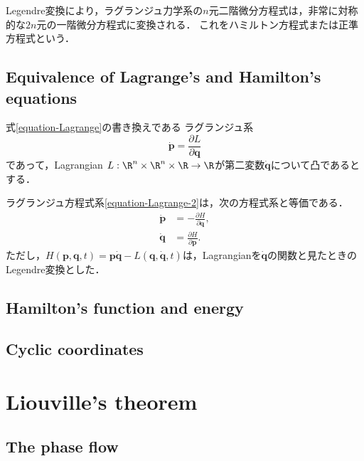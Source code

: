 \documentclass[uplatex, 12pt, dvipdfmx]{jsreport}
\begin{document}
\begin{screen}
    Legendre変換により，ラグランジュ力学系の$n$元二階微分方程式は，非常に対称的な$2n$元の一階微分方程式に変換される．
    これをハミルトン方程式または正準方程式という．
\end{screen}

\subsection{Equivalence of Lagrange's and Hamilton's equations}

式\ref{equation-Lagrange}の書き換えである
ラグランジュ系
\begin{equation}\label{equation-Lagrange-2}
    \dot{\mathbf{p}}=\frac{\partial L}{\partial\mathbf{q}}
\end{equation}
であって，Lagrangian $L:\R^n\times\R^n\times\R\to\R$が第二変数$\dot{\mathbf{q}}$について凸であるとする．

\begin{theorem}
    ラグランジュ方程式系\ref{equation-Lagrange-2}は，次の方程式系と等価である．
    \begin{align*}
        \dot{\mathbf{p}} &= -\frac{\partial H}{\partial\mathbf{q}},\\
        \dot{\mathbf{q}} &= \frac{\partial H}{\partial\mathbf{p}}.
    \end{align*}
    ただし，$H(\mathbf{p},\mathbf{q},t)=\mathbf{p\dot{q}}-L(\mathbf{q},\dot{\mathbf{q}},t)$は，Lagrangianを$\dot{\mathbf{q}}$の関数と見たときのLegendre変換とした．
\end{theorem}

\subsection{Hamilton's function and energy}

\subsection{Cyclic coordinates}

\section{Liouville's theorem}

\subsection{The phase flow}
\end{document}

